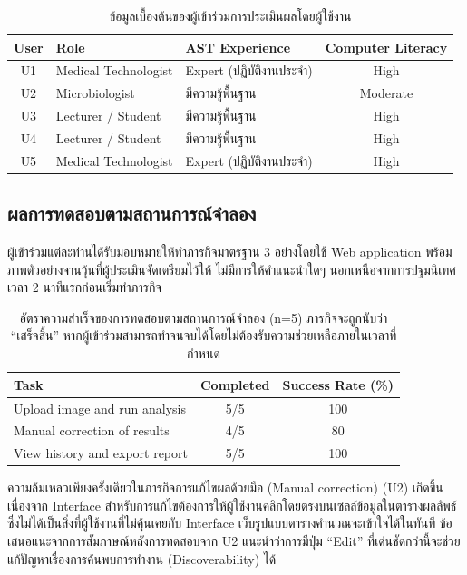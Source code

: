 \begin{table}[H]
  \centering
  \caption{ข้อมูลเบื้องต้นของผู้เข้าร่วมการประเมินผลโดยผู้ใช้งาน}
  \label{tab:user_profile}
  \begin{tabular}{cllc}
    \toprule
    \textbf{User} & \textbf{Role} & \textbf{AST Experience} & \textbf{Computer Literacy} \\
    \midrule
    U1 & Medical Technologist & Expert (ปฏิบัติงานประจำ) & High \\
    U2 & Microbiologist        & มีความรู้พื้นฐาน          & Moderate \\
    U3 & Lecturer / Student    & มีความรู้พื้นฐาน          & High \\
    U4 & Lecturer / Student    & มีความรู้พื้นฐาน          & High \\
    U5 & Medical Technologist  & Expert (ปฏิบัติงานประจำ) & High \\
    \bottomrule
  \end{tabular}
\end{table}

\subsection{ผลการทดสอบตามสถานการณ์จำลอง}

ผู้เข้าร่วมแต่ละท่านได้รับมอบหมายให้ทำภารกิจมาตรฐาน 3 อย่างโดยใช้ Web application พร้อมภาพตัวอย่างจานวุ้นที่ผู้ประเมินจัดเตรียมไว้ให้ ไม่มีการให้คำแนะนำใดๆ นอกเหนือจากการปฐมนิเทศเวลา 2 นาทีแรกก่อนเริ่มทำภารกิจ

\begin{table}[H]
  \centering
  \caption{อัตราความสำเร็จของการทดสอบตามสถานการณ์จำลอง (n=5)
           ภารกิจจะถูกนับว่า ``เสร็จสิ้น'' หากผู้เข้าร่วมสามารถทำจนจบได้โดยไม่ต้องรับความช่วยเหลือภายในเวลาที่กำหนด}
  \label{tab:scenario}
  \begin{tabular}{lcc}
    \toprule
    \textbf{Task} & \textbf{Completed} & \textbf{Success Rate (\%)} \\
    \midrule
    Upload image and run analysis      & 5/5 & 100 \\
    Manual correction of results       & 4/5 & 80  \\
    View history and export report     & 5/5 & 100 \\
    \bottomrule
  \end{tabular}
\end{table}

ความล้มเหลวเพียงครั้งเดียวในภารกิจการแก้ไขผลด้วยมือ (Manual correction) (U2) เกิดขึ้นเนื่องจาก Interface สำหรับการแก้ไขต้องการให้ผู้ใช้งานคลิกโดยตรงบนเซลล์ข้อมูลในตารางผลลัพธ์ ซึ่งไม่ได้เป็นสิ่งที่ผู้ใช้งานที่ไม่คุ้นเคยกับ Interface เว็บรูปแบบตารางคำนวณจะเข้าใจได้ในทันที ข้อเสนอแนะจากการสัมภาษณ์หลังการทดสอบจาก U2 แนะนำว่าการมีปุ่ม ``Edit'' ที่เด่นชัดกว่านี้จะช่วยแก้ปัญหาเรื่องการค้นพบการทำงาน (Discoverability) ได้

